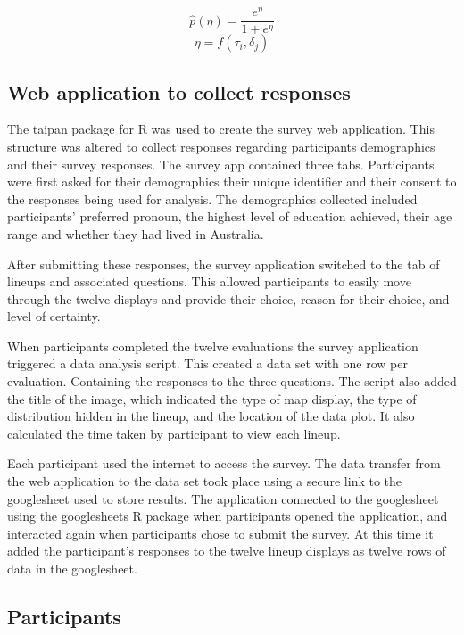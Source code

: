 \documentclass[
doublespace,
  times]{anzsauth}
\begin{document}
\[\widehat{p}(\eta) = \frac{e^{\eta}}{1 + e^{\eta}}\]
\label{eq:transform} \[\eta = f(\tau_i,\delta_j)\]

\subsection{Web application to collect
responses}\label{web-application-to-collect-responses}

The taipan \citep{taipan} package for R was used to create the survey
web application. This structure was altered to collect responses
regarding participants demographics and their survey responses. The
survey app contained three tabs. Participants were first asked for their
demographics their unique identifier and their consent to the responses
being used for analysis. The demographics collected included
participants' preferred pronoun, the highest level of education
achieved, their age range and whether they had lived in Australia.

After submitting these responses, the survey application switched to the
tab of lineups and associated questions. This allowed participants to
easily move through the twelve displays and provide their choice, reason
for their choice, and level of certainty.

When participants completed the twelve evaluations the survey
application triggered a data analysis script. This created a data set
with one row per evaluation. Containing the responses to the three
questions. The script also added the title of the image, which indicated
the type of map display, the type of distribution hidden in the lineup,
and the location of the data plot. It also calculated the time taken by
participant to view each lineup.

Each participant used the internet to access the survey. The data
transfer from the web application to the data set took place using a
secure link to the googlesheet used to store results. The application
connected to the googlesheet using the googlesheets \citep{sheets} R
package when participants opened the application, and interacted again
when participants chose to submit the survey. At this time it added the
participant's responses to the twelve lineup displays as twelve rows of
data in the googlesheet.

\subsection{Participants}\label{participants}
\end{document}
